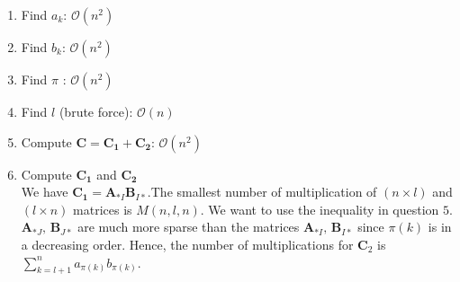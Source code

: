 \documentclass[10pt,a4paper]{article}
\begin{document}
\begin{enumerate}
\item Find $a_k$:   $\mathcal{O}(n^2)$
\item Find $b_k$:   $\mathcal{O}(n^2)$
\item Find $\pi$ :   $\mathcal{O}( n^2 )$
\item Find $l$ (brute force): $\mathcal{O}(n)$
\item Compute $\mathbf{C = C_1 + C_2}$:    $\mathcal{O}(n^2)$
\item Compute $\mathbf{C_1}$ and $\mathbf{C_2}$\\

We have $\mathbf{C_1} = \mathbf{A}_{*I}\mathbf{B}_{I*}$.The smallest number of multiplication of $(n\times l)$ and $(l\times n)$ matrices is $M(n,l,n)$. We want to use the inequality in question $5$. $\mathbf{A}_{*J}, \,\mathbf{B}_{J*}$ are much more sparse than the matrices $\mathbf{A}_{*I}, \,\mathbf{B}_{I*}$ since $\pi(k)$ is in a decreasing order. Hence, the number of multiplications for $\mathbf{C}_2$ is $\sum _{k=l+1}^n a_{\pi(k)}b_{\pi(k)}$.


\end{enumerate}
\end{document}
